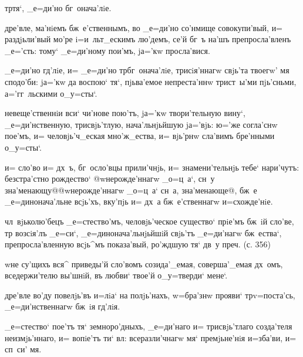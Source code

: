 
  \kinovarsimple{[_е=гw'же}   
тр тя`, _е=ди'но бг~онача'лiе. \kinovarsimple{Митрофа'ново.] 
Гла'съ г~}


  дре'вле, ма'нiемъ бж~е'ственнымъ, 
во _е=ди'но со'нмище совокупи'вый, и= раздjьли'вый мо'ре 
i=и~льт_ескимъ лю'демъ, се'й бг~ъ на'шъ препросла'вленъ 
_е='сть: тому` _е=ди'ному пои'мъ, jа='кw просла'вися.

 _е=ди'но гд'лiе, и= _е=ди'но 
тр бг~онача'лiе, трисiя'ннагw свjь'та твоегw' мя 
сподо'би: jа='кw да воспою` тя`, пjьва'емое непреста'ннw 
трист~ы'ми пjь'сньми, а='гг~льскими о_у=сты`.

 невеще'ственнiи вси` чи'нове пою'тъ, 
jа='кw твори'тельную вину`, _е=ди'нственную, 
трисвjь'тлую, нача'льнjьйшую jа='вjь: ю='же согла'снw 
пое'мъ, и= человjь'ч_еская мно'ж_ества, и= вjь'рнw 
сла'вимъ бре'нными о_у=сты`.

  и= сло'во и= дх~ъ, бг~осло'вцы 
прили'чнjь, и= знамени'тельнjь тебе` нари'чутъ: 
безстра'стно рождество` @w\т нерожде'ннагw _о=ц~а`, сн~у 
зна'менающу@{@w\т нерожде'ннагw _о=ц~а` сн~а, 
зна'менающе@}, бж~е _е=динонача'льне всjь'хъ, вку'пjь и= 
дх~а бж~е'ственнагw и=схожде'нiе.

   чл~вjьколю'бецъ _е=стество'мъ, 
человjь'ческое существо` прiе'мъ бж~iй сло'ве, тр 
возсiя'лъ _е=си`, _е=динонача'льнjьйшiй свjь'тъ 
_е=ди'нагw бж~ества`, препросла'вленную всjь^мъ 
показа'вый, ро'ждшую тя` дв~у преч. (с. 356)


  w\т не су'щихъ вся^ приведы'й 
сло'вомъ созида'_емая, соверша'_емая дх~омъ, 
вседержи'телю вы'шнiй, въ любви` твое'й о_у=тверди` 
мене`.

 дре'вле во'ду повелjь'въ и=лiа` на 
полjь'нахъ, w=бра'знw прояви` тр v=поста'сь, 
_е=ди'нственнагw бж~iя гд'лiя.

 _е=стество` пое'тъ тя` земноро'дныхъ, 
_е=ди'наго и= трисвjь'тлаго созда'теля неизмjь'ннаго, и= 
вопiе'тъ ти` вл: всеразли'чнагw мя` премjьне'нiя 
и=зба'ви, и= сп~си' мя.

